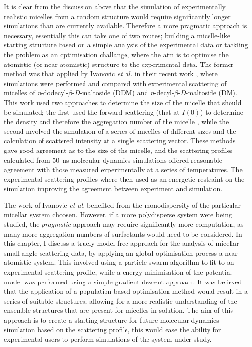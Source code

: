 It is clear from the discussion above that the simulation of experimentally realistic micelles from a random structure would require significantly longer simulations than are currently available.
Therefore a more pragmatic approach is necessary, essentially this can take one of two routes; building a micelle-like starting structure based on a simple analysis of the experimental data or tackling the problem as an optimisation challange, where the aim is to optimise the atomistic (or near-atomistic) structure to the experimental data.
The former method was that applied by Ivanovic \emph{et al.} in their recent work \cite{ivanovic_temperature-dependent_2018}, where simulations were performed and compared with experimental scattering of micelles of \emph{n}-dodecyl-$\beta$-\emph{D}-maltoside (DDM) and \emph{n}-decyl-$\beta$-\emph{D}-maltoside (DM).
This work used two approaches to determine the size of the micelle that should be simulated; the first used the forward scattering (that at $I(0)$) to determine the density and therefore the aggregation number of the micelle \cite{lipfert_size_2007}, while the second involved the simulation of a series of micelles of different sizes and the calculation of scattered intensity at a single scattering vector.
These methods gave good agreement as to the size of the micelle, and the scattering profiles calculated from \SI{50}{\nano\second} molecular dynamics simulations offered reasonable agreement with those measured experimentally at a series of temperatures.
The experimental scattering profiles where then used as an energetic restraint on the simulation improving the agreement between experiment and simulation.

The work of Ivanovic \emph{et al.} benefited from the monodispersity of the particular micellar system choosen.
However, if a more polydisperse system were being studied, the \emph{pragmatic} approach may require significantly more computation, as many more aggregation numbers of surfactants would need to be considered.
In this chapter, I discuss a truely-model free approach for the analysis of micellar small angle scattering data, by applying an global-optimisation process a near-atomistic system.
This involved using a particle swarm algorithm to fit to an experimental scattering profile, while a energy minimisation of the potential model was performed using a simple gradient descent approach.
It was believed that the application of a population-based optimisation method would result in a series of suitable structures, allowing for a more realistic understanding of the ensemble structures that are present for micelles in solution.
The aim of this approach is to create a starting structure for future molecular dynamics simulation based on the scattering profile, this would ease the ability for experimental users to perform simulations of the system under study.
